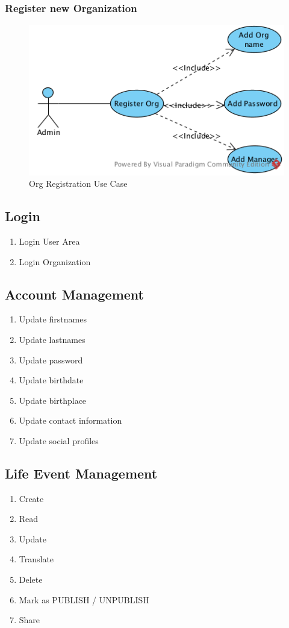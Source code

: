 \subsubsection{Register new Organization}
\label{sec:regist-new-organ}

\begin{figure}[htpb]
  \centering
  \includegraphics[scale=.75]{figures/UseCaseRegisterOrg.png}
  \caption{Org Registration Use Case}
  \label{fig:usecase-register-org}
\end{figure}


\subsection{Login}
\label{sec:login}

\begin{enumerate}
\item Login User Area
\item Login Organization
\end{enumerate}


\subsection{Account Management}
\label{sec:accounts}
\begin{enumerate}
\item Update firstnames
\item Update lastnames
\item Update password
\item Update birthdate
\item Update birthplace
\item Update contact information
\item Update social profiles
\end{enumerate}

\subsection{Life Event Management}
\label{sec:life-events}
\begin{enumerate}
\item Create
\item Read
\item Update
\item Translate
\item Delete
\item Mark as PUBLISH / UNPUBLISH
\item Share

\end{enumerate}

